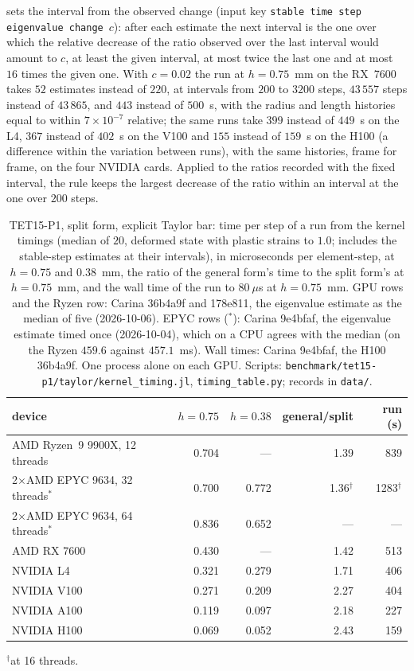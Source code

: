 \documentclass{article}
\newcommand{\code}[1]{\texttt{#1}}
\theoremstyle{definition}
\theoremstyle{plain}
\begin{document}
sets the interval from the observed change (input key \code{stable time step
eigenvalue change}~$c$): after each estimate the next interval is the one
over which the relative decrease of the ratio observed over the last
interval would amount to $c$, at least the given interval, at most twice the
last one and at most $16$ times the given one. With $c = 0.02$ the run at
$h = 0.75$~mm on the RX~7600 takes $52$ estimates instead of $220$, at
intervals from $200$ to $3200$ steps, $43\,557$ steps instead of
$43\,865$, and $443$ instead of $500$~s, with the radius and length
histories equal to within $7\times10^{-7}$ relative; the same runs take
$399$ instead of $449$~s on the L4, $367$ instead of $402$~s on the V100 and
$155$ instead of $159$~s on the H100 (a difference within the variation
between runs), with the same histories, frame for frame, on the four NVIDIA
cards. Applied to the ratios
recorded with the fixed interval, the rule keeps the largest decrease of the
ratio within an interval at the one over $200$ steps.

\begin{table}[tbp]
\centering
\caption{TET15-P1, split form, explicit Taylor bar: time per step of a run
from the kernel timings (median of $20$, deformed state with plastic strains
to $1.0$; includes the stable-step estimates at their intervals), in
microseconds per element-step, at $h = 0.75$ and $0.38$~mm, the ratio of the
general form's time to the split form's at $h = 0.75$~mm, and the wall time
of the run to $80~\mu$s at $h = 0.75$~mm. GPU rows and the Ryzen row:
Carina 36b4a9f and 178e811, the eigenvalue estimate as the median of five
(2026-10-06). EPYC rows ($^{*}$): Carina 9e4bfaf, the eigenvalue estimate
timed once (2026-10-04), which on a CPU agrees with the median (on the Ryzen
$459.6$ against $457.1$~ms). Wall times: Carina 9e4bfaf, the H100 36b4a9f.
One process alone on each GPU. Scripts:
\code{benchmark/tet15-p1/taylor/kernel\_timing.jl}, \code{timing\_table.py};
records in \code{data/}.}
\label{tab:taylordevices}
\small
\begin{tabular}{lrrrr}
\toprule
device & $h = 0.75$ & $h = 0.38$ & general/split & run (s) \\
\midrule
AMD Ryzen~9 9900X, 12 threads  & 0.704 & ---   & 1.39 & 839 \\
2$\times$AMD EPYC 9634, 32 threads$^{*}$ & 0.700 & 0.772 & 1.36$^{\dagger}$ & 1283$^{\dagger}$ \\
2$\times$AMD EPYC 9634, 64 threads$^{*}$ & 0.836 & 0.652 & --- & --- \\
AMD RX 7600                    & 0.430 & ---   & 1.42 & 513 \\
NVIDIA L4                      & 0.321 & 0.279 & 1.71 & 406 \\
NVIDIA V100                    & 0.271 & 0.209 & 2.27 & 404 \\
NVIDIA A100                    & 0.119 & 0.097 & 2.18 & 227 \\
NVIDIA H100                    & 0.069 & 0.052 & 2.43 & 159 \\
\bottomrule
\end{tabular}

\smallskip
$^{\dagger}$at 16 threads.
\end{table}
\end{document}
